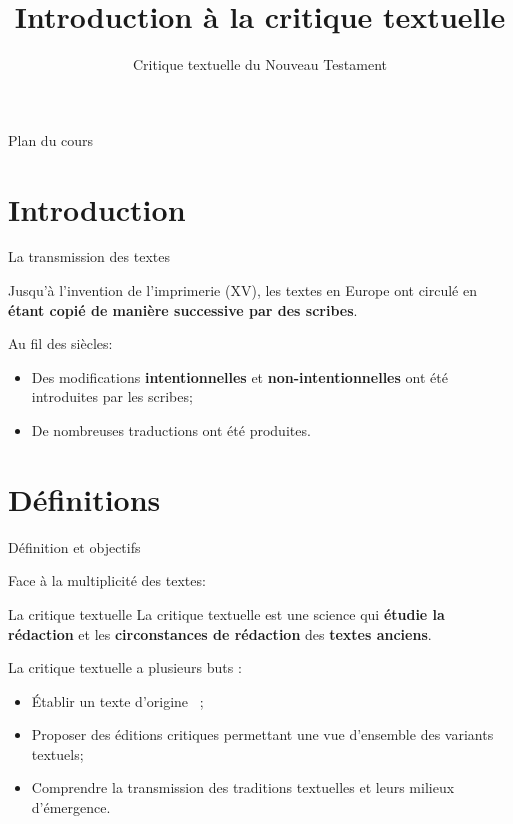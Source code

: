 \documentclass[11pt]{beamer}
\begin{document}
\title{Introduction à la critique textuelle}
\subtitle{Critique textuelle du Nouveau Testament}

\begin{frame}{}
    \titlepage
\end{frame}

\begin{frame}{Plan du cours}
\tableofcontents
\end{frame}

\section{Introduction}

\begin{frame}{La transmission des textes}
    \begin{block}{}
        Jusqu'à l'invention de l'imprimerie (XV\ieme{}), les textes en Europe ont circulé en \textbf{étant copié de manière successive par des scribes}.
    \end{block}
    Au fil des siècles:
    \begin{itemize}
        \item Des modifications \textbf{intentionnelles} et \textbf{non-intentionnelles} ont été introduites par les scribes;
        \item De nombreuses traductions ont été produites.
    \end{itemize}
\end{frame}

\section{Définitions}




\begin{frame}{Définition et objectifs}

    Face à la multiplicité des textes:

    \begin{alertblock}{La critique textuelle}
        La critique textuelle est une science qui \textbf{étudie la rédaction} et les \textbf{circonstances de rédaction} des \textbf{textes anciens}.
    \end{alertblock}
    \pause

        La critique textuelle a plusieurs buts :
    \begin{itemize}

        \item Établir un texte \og d'origine \fg\ ;
        \pause
        \item Proposer des éditions critiques permettant une vue d'ensemble des variants textuels;
        \pause
        \item Comprendre la transmission des traditions textuelles et leurs milieux d'émergence.
    \end{itemize}
\end{frame}
\end{document}
